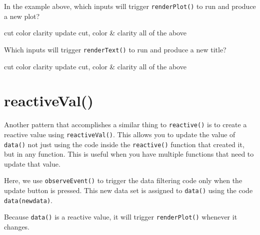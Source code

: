 \documentclass[
]{book}
\begin{document}
In the example above, which inputs will trigger \texttt{renderPlot()} to run and produce a new plot?

cut color clarity update cut, color \& clarity all of the above

Which inputs will trigger \texttt{renderText()} to run and produce a new title?

cut color clarity update cut, color \& clarity all of the above

\hypertarget{reactiveval}{%
\section{reactiveVal()}\label{reactiveval}}

Another pattern that accomplishes a similar thing to \texttt{reactive()} is to create a reactive value using \texttt{reactiveVal()}. This allows you to update the value of \texttt{data()} not just using the code inside the \texttt{reactive()} function that created it, but in any function. This is useful when you have multiple functions that need to update that value.

Here, we use \texttt{observeEvent()} to trigger the data filtering code only when the update button is pressed. This new data set is assigned to \texttt{data()} using the code \texttt{data(newdata)}.

Because \texttt{data()} is a reactive value, it will trigger \texttt{renderPlot()} whenever it changes.
\end{document}
